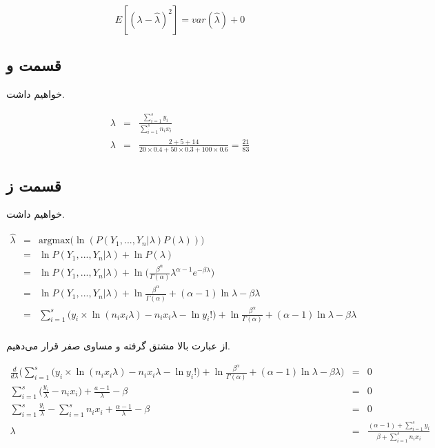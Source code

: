 \documentclass{article}
\begin{document}
$$E[(\lambda -\hat{\lambda})^2] = var(\hat{\lambda}) + 0 $$

\subsection*{قسمت و}

خواهیم داشت.

\begin{eqnarray*}
    \lambda & = & \frac{\sum_{i=1}^{s} y_i}{\sum_{i=1}^{s} n_ix_i} \\
    \lambda & = & \frac{2 + 5 + 14}{20 \times 0.4 + 50 \times 0.3 + 100 \times 0.6} = \frac{21}{83}
\end{eqnarray*}

\subsection*{قسمت ز}

خواهیم داشت.

\begin{eqnarray*}
    \hat{\lambda} & = & \text{argmax}\Big(\ln(P(Y_1, ..., Y_n|\lambda) P(\lambda))\Big) \\
    & = & \ln P(Y_1, ..., Y_n|\lambda) + \ln P(\lambda) \\
    & = & \ln P(Y_1, ..., Y_n|\lambda) + \ln \Big(\frac{\beta^\alpha}{\Gamma(\alpha)}\lambda^{\alpha-1} e^{-\beta \lambda}\Big) \\
    & = & \ln P(Y_1, ..., Y_n|\lambda) + \ln \frac{\beta^\alpha}{\Gamma(\alpha)} + (\alpha - 1)\ln \lambda - \beta \lambda \\
    & = & \sum_{i=1}^{s} \Big( y_i \times \ln(n_ix_i\lambda) - n_ix_i\lambda - \ln y_i! \Big)+ \ln \frac{\beta^\alpha}{\Gamma(\alpha)} + (\alpha - 1)\ln \lambda - \beta \lambda \\
\end{eqnarray*}

از عبارت بالا مشتق گرفته و مساوی صفر قرار می‌دهیم.

\begin{eqnarray*}
    \frac{d}{d\lambda}\Big(\sum_{i=1}^{s} \Big( y_i \times \ln(n_ix_i\lambda) - n_ix_i\lambda - \ln y_i! \Big)+ \ln \frac{\beta^\alpha}{\Gamma(\alpha)} + (\alpha - 1)\ln \lambda - \beta \lambda\Big) & = & 0 \\
    \sum_{i=1}^{s} \Big( \frac{y_i}{\lambda} - n_ix_i \Big) + \frac{a-1}{\lambda} - \beta & = & 0 \\
    \sum_{i=1}^{s} \frac{y_i}{\lambda} - \sum_{i=1}^{s}n_ix_i + \frac{\alpha-1}{\lambda} - \beta & = & 0 \\
    \lambda & = & \frac{(\alpha-1) + \sum_{i=1}^{s} y_i}{\beta + \sum_{i=1}^{s}n_ix_i} \\
\end{eqnarray*}
\end{document}
